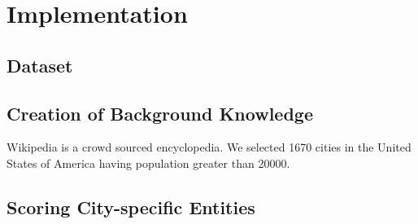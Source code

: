  
\section{Implementation}
\label{sec:implementation}

\subsection{Dataset}

\subsection{Creation of Background Knowledge}
Wikipedia is a crowd sourced encyclopedia. 
We selected 1670 cities in the United States of America having population greater than 20000.%

\subsection{Scoring City-specific Entities}

